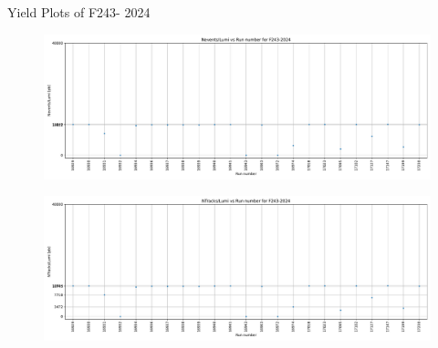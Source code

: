 \begin{frame}{Yield Plots of F243- 2024}
    \begin{figure}
        \centering
        \includegraphics[width=1.0\textwidth]{plots_runwise/NEventsbyLumi_2024_F243.pdf}
    \end{figure}
    \vspace{-0.35cm}
    \begin{figure}
        \centering
        \includegraphics[width=1.0\textwidth]{plots_runwise/NTracksbyLumi_2024_F243.pdf}
    \end{figure}
\end{frame}

